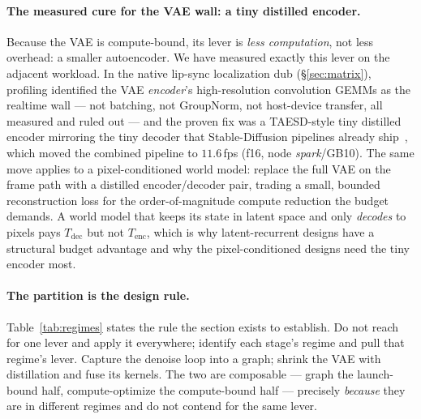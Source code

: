 \documentclass[11pt]{article}
\newcommand{\Tenc}{\ensuremath{T_{\mathrm{enc}}}}
\newcommand{\Tdec}{\ensuremath{T_{\mathrm{dec}}}}
\begin{document}
\paragraph{The measured cure for the VAE wall: a tiny distilled encoder.} Because the VAE is compute-bound,
its lever is \emph{less computation}, not less overhead: a smaller autoencoder. We have measured exactly this
lever on the adjacent workload. In the native lip-sync localization dub (\S\ref{sec:matrix}), profiling
identified the VAE \emph{encoder}'s high-resolution convolution GEMMs as the realtime wall --- not batching,
not GroupNorm, not host-device transfer, all measured and ruled out --- and the proven fix was a TAESD-style
tiny distilled encoder mirroring the tiny decoder that Stable-Diffusion pipelines already
ship~\cite{taesd,ldm}, which moved the combined pipeline to $11.6$\,fps (f16, node \emph{spark}/GB10). The same
move applies to a pixel-conditioned world model: replace the full VAE on the frame path with a distilled
encoder/decoder pair, trading a small, bounded reconstruction loss for the order-of-magnitude compute
reduction the budget demands. A world model that keeps its state in latent space and only \emph{decodes} to
pixels pays $\Tdec$ but not $\Tenc$, which is why latent-recurrent designs have a structural budget advantage
and why the pixel-conditioned designs need the tiny encoder most.

\paragraph{The partition is the design rule.} Table~\ref{tab:regimes} states the rule the section exists to
establish. Do not reach for one lever and apply it everywhere; identify each stage's regime and pull that
regime's lever. Capture the denoise loop into a graph; shrink the VAE with distillation and fuse its kernels.
The two are composable --- graph the launch-bound half, compute-optimize the compute-bound half --- precisely
\emph{because} they are in different regimes and do not contend for the same lever.
\end{document}
